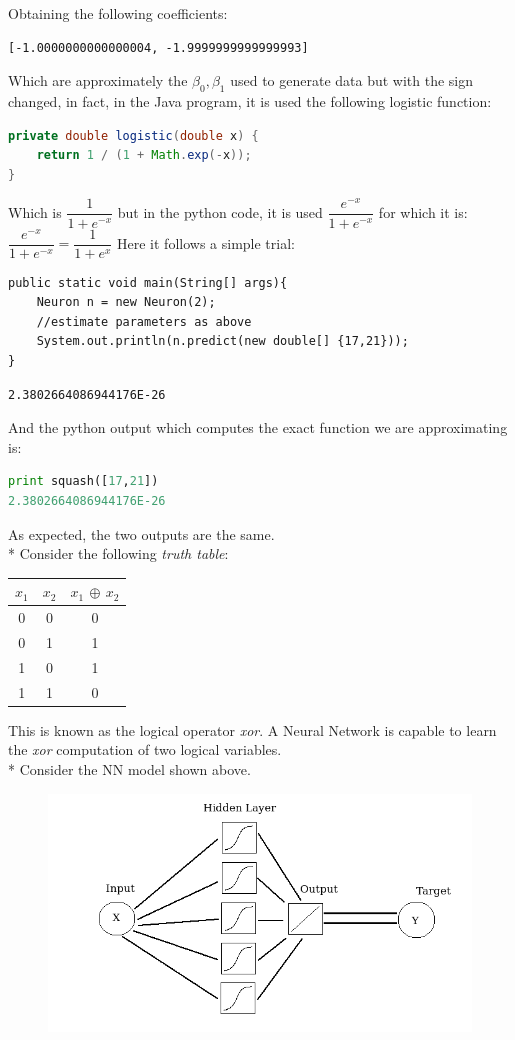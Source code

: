 \documentclass[10pt,a4paper]{article}
\begin{document}
Obtaining the following coefficients:
\begin{lstlisting}
[-1.0000000000000004, -1.9999999999999993]
\end{lstlisting}
Which are approximately the $\beta_0,\beta_1$ used to generate data but with the sign changed, in fact, in the Java program, it is used the following logistic function:
\begin{lstlisting}[language = Java]
private double logistic(double x) {
	return 1 / (1 + Math.exp(-x));
}
\end{lstlisting}
Which is
$
\dfrac{1}{1+e^{-x}}
$
 but in the python code, it is used
$
\dfrac{e^{-x}}{1+e^{-x}}
$
 for which it is:
$
\dfrac{e^{-x}}{1+e^{-x}} = \dfrac{1}{1 + e^x}
$
Here it follows a simple trial:
\begin{lstlisting}
public static void main(String[] args){
	Neuron n = new Neuron(2);
	//estimate parameters as above
	System.out.println(n.predict(new double[] {17,21}));
}
\end{lstlisting}
\begin{lstlisting}
2.3802664086944176E-26
\end{lstlisting}
And the python output which computes the exact function we are approximating is:
\begin{lstlisting}[language=Python]
print squash([17,21])
2.3802664086944176E-26
\end{lstlisting}
As expected, the two outputs are the same.\\*
Consider the following \emph{truth table}:
\begin{center}
\begin{tabular}{|c|c|c|}
	\hline 
	$x_1$ & $x_2$ & $x_1$ $\oplus$ $x_2$ \\ 
	\hline 
	0 & 0 & 0 \\ 
	\hline 
	0 & 1 & 1 \\ 
	\hline 
	1 & 0 & 1 \\ 
	\hline 
	1 & 1 & 0 \\ 
	\hline 
\end{tabular}
\end{center} 
This is known as the logical operator \textit{xor}. A Neural Network is capable to learn the \textit{xor} computation of two logical variables.\\*
Consider the NN model shown above.
\begin{figure}[h]
	\centering
	\includegraphics[scale=0.4]{img/mymodel}
	\label{fig:mymodel}
\end{figure}
\end{document}
